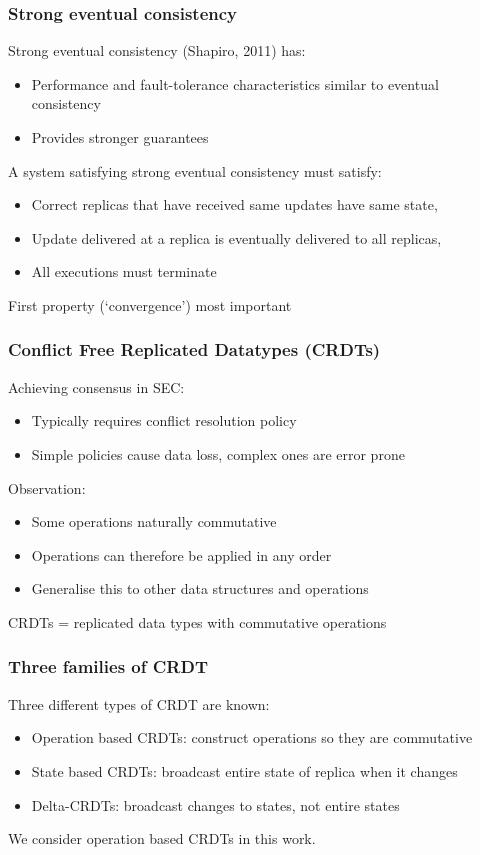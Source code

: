 \documentclass[professionalfonts,smallfonts]{beamer}
\begin{document}
\begin{frame}
\frametitle{Strong eventual consistency}
Strong eventual consistency (Shapiro, 2011) has:
\begin{itemize}
\item
Performance and fault-tolerance characteristics similar to eventual consistency
\item
Provides stronger guarantees
\end{itemize}
A system satisfying strong eventual consistency must satisfy:
\begin{itemize}
\item
Correct replicas that have received same updates have same state,
\item
Update delivered at a replica is eventually delivered to all replicas,
\item
All executions must terminate
\end{itemize}
First property (`convergence') most important
\end{frame}

\begin{frame}
\frametitle{Conflict Free Replicated Datatypes (CRDTs)}
Achieving consensus in SEC:
\begin{itemize}
\item
Typically requires conflict resolution policy
\item
Simple policies cause data loss, complex ones are error prone
\end{itemize}
Observation:
\begin{itemize}
\item
Some operations naturally commutative
\item
Operations can therefore be applied in any order
\item
Generalise this to other data structures and operations
\end{itemize}
CRDTs = replicated data types with commutative operations
\end{frame}

\begin{frame}
\frametitle{Three families of CRDT}
Three different types of CRDT are known:
\begin{itemize}
\item
Operation based CRDTs: construct operations so they are commutative
\item
State based CRDTs: broadcast entire state of replica when it changes
\item
Delta-CRDTs: broadcast changes to states, not entire states
\end{itemize}
We consider operation based CRDTs in this work.
\end{frame}
\end{document}
